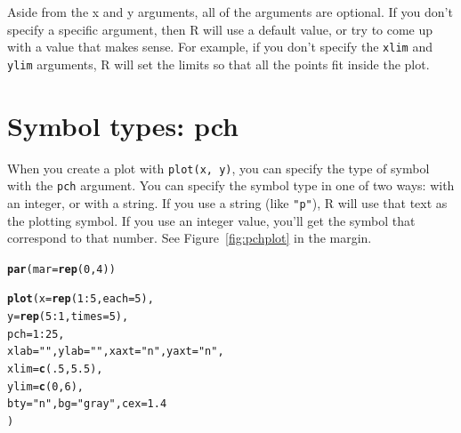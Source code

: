 \documentclass{tufte-book}\usepackage[]{graphicx}\usepackage[]{color}
\makeatletter
\newcommand{\hlnum}[1]{\textcolor[rgb]{0.686,0.059,0.569}{#1}}%
\newcommand{\hlstr}[1]{\textcolor[rgb]{0.192,0.494,0.8}{#1}}%
\newcommand{\hlopt}[1]{\textcolor[rgb]{0,0,0}{#1}}%
\newcommand{\hlstd}[1]{\textcolor[rgb]{0.345,0.345,0.345}{#1}}%
\newcommand{\hlkwc}[1]{\textcolor[rgb]{0.333,0.667,0.333}{#1}}%
\newcommand{\hlkwd}[1]{\textcolor[rgb]{0.737,0.353,0.396}{\textbf{#1}}}%
\newenvironment{kframe}{%
 \def\at@end@of@kframe{}%
 \ifinner\ifhmode%
  \def\at@end@of@kframe{\end{minipage}}%
  \begin{minipage}{\columnwidth}%
 \fi\fi%
 \def\FrameCommand##1{\hskip\@totalleftmargin \hskip-\fboxsep
 \colorbox{shadecolor}{##1}\hskip-\fboxsep
     \hskip-\linewidth \hskip-\@totalleftmargin \hskip\columnwidth}%
 \MakeFramed {\advance\hsize-\width
   \@totalleftmargin\z@ \linewidth\hsize
   \@setminipage}}%
 {\par\unskip\endMakeFramed%
 \at@end@of@kframe}
\newenvironment{knitrout}{}{} %
\makeatother
\begin{document}
\begin{footnotesize}
\begin{footnotesize}
\begin{knitrout}
{}



\end{knitrout}
\end{footnotesize}


Aside from the x and y arguments, all of the arguments are optional. If you don't specify a specific argument, then R will use a default value, or try to come up with a value that makes sense. For example, if you don't specify the \texttt{xlim} and \texttt{ylim} arguments, R will set the limits so that all the points fit inside the plot.

\section{Symbol types: pch}

When you create a plot with \texttt{plot(x, y)}, you can specify the type of symbol with the \texttt{pch} argument. You can specify the symbol type in one of two ways: with an integer, or with a string. If you use a string (like \texttt{"p"}), R will use that text as the plotting symbol. If you use an integer value, you'll get the symbol that correspond to that number. See Figure~\ref{fig:pchplot} in the margin.

\begin{marginfigure}
\begin{tiny}
\begin{knitrout}
\color{fgcolor}\begin{kframe}
\begin{alltt}
\hlkwd{par}\hlstd{(}\hlkwc{mar}  \hlstd{=} \hlkwd{rep}\hlstd{(}\hlnum{0}\hlstd{,} \hlnum{4}\hlstd{))}

\hlkwd{plot}\hlstd{(}\hlkwc{x} \hlstd{=} \hlkwd{rep}\hlstd{(}\hlnum{1}\hlopt{:}\hlnum{5}\hlstd{,} \hlkwc{each} \hlstd{=} \hlnum{5}\hlstd{),}
     \hlkwc{y} \hlstd{=} \hlkwd{rep}\hlstd{(}\hlnum{5}\hlopt{:}\hlnum{1}\hlstd{,} \hlkwc{times} \hlstd{=} \hlnum{5}\hlstd{),}
     \hlkwc{pch} \hlstd{=} \hlnum{1}\hlopt{:}\hlnum{25}\hlstd{,}
     \hlkwc{xlab} \hlstd{=} \hlstr{""}\hlstd{,} \hlkwc{ylab} \hlstd{=} \hlstr{""}\hlstd{,} \hlkwc{xaxt} \hlstd{=} \hlstr{"n"}\hlstd{,} \hlkwc{yaxt} \hlstd{=} \hlstr{"n"}\hlstd{,}
     \hlkwc{xlim} \hlstd{=} \hlkwd{c}\hlstd{(}\hlnum{.5}\hlstd{,} \hlnum{5.5}\hlstd{),}
     \hlkwc{ylim} \hlstd{=} \hlkwd{c}\hlstd{(}\hlnum{0}\hlstd{,} \hlnum{6}\hlstd{),}
     \hlkwc{bty} \hlstd{=} \hlstr{"n"}\hlstd{,} \hlkwc{bg} \hlstd{=} \hlstr{"gray"}\hlstd{,} \hlkwc{cex} \hlstd{=} \hlnum{1.4}
     \hlstd{)}


\end{alltt}
\end{kframe}
\end{knitrout}
\end{tiny}
\end{marginfigure}
\end{footnotesize}
\end{document}
